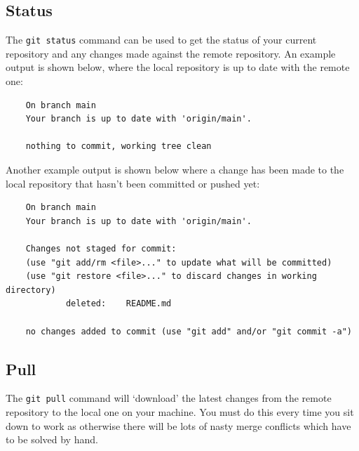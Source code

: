 \documentclass[a4paper, 11pt]{article}
\begin{document}
\subsection{Status}
The \verb|git status| command can be used to get the status of your current repository and any changes made against the remote repository. An example output is shown below, where the local repository is up to date with the remote one:
\begin{verbatim}
    On branch main
    Your branch is up to date with 'origin/main'.

    nothing to commit, working tree clean
\end{verbatim}
Another example output is shown below where a change has been made to the local repository that hasn't been committed or pushed yet:
\begin{verbatim}
    On branch main
    Your branch is up to date with 'origin/main'.

    Changes not staged for commit:
    (use "git add/rm <file>..." to update what will be committed)
    (use "git restore <file>..." to discard changes in working directory)
            deleted:    README.md

    no changes added to commit (use "git add" and/or "git commit -a")
\end{verbatim}

\subsection{Pull}
The \verb|git pull| command will `download' the latest changes from the remote repository to the local one on your machine. You must do this every time you sit down to work as otherwise there will be lots of nasty merge conflicts which have to be solved by hand.
\end{document}
